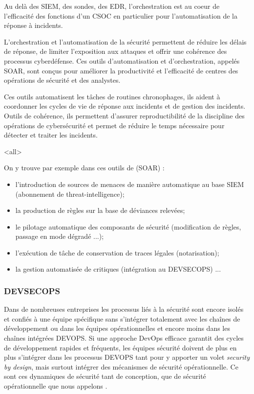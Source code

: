 Au delà des SIEM, des sondes, des EDR, l'orchestration est au coeur de l'efficacité des fonctions d'un CSOC en particulier pour l'automatisation de la réponse à incidents.

L'orchestration et l'automatisation de la sécurité  permettent de réduire les délais de réponse, de  limiter l'exposition aux attaques et offrir une cohérence des processus cyberdéfense. Ces  outils d’automatisation et d’orchestration,  appelés SOAR, sont conçus pour améliorer la productivité et l’efficacité de centres des opérations de sécurité et des analystes.

Ces outils automatisent les tâches de routines chronophages,  ils aident à coordonner les cycles de vie de réponse aux incidents et de gestion des incidents. Outils de  cohérence, ils permettent d'assurer reproductibilité de la discipline des opérations de cybersécurité et permet de réduire le temps nécessaire pour détecter et traiter les incidents.


\mode<all>{
{
On y trouve par exemple dans ces outils de   (SOAR) :
\begin{itemize}
  \item l'introduction de sources de menaces de manière automatique au base SIEM (abonnement de threat-intelligence);
  \item la production de règles sur la base de déviances relevées;
  \item le pilotage automatique des composants de sécurité (modification de règles, passage en mode dégradé ...);
  \item l'exécution de tâche de conservation de traces légales (notarisation);
  \item la gestion automatisée de  critiques (intégration au DEVSECOPS) ...
\end{itemize}
}} %



\subsubsection{DEVSECOPS}

Dans de nombreuses entreprises les processus liés à la sécurité sont encore isolés et confiés à une équipe spécifique sans s'intégrer totalement avec les chaînes de développement ou dans les équipes opérationnelles et encore moins dans les chaînes intégrées DEVOPS. 
 Si une approche DevOps efficace garantit des cycles de développement rapides et fréquents, les équipes sécurité doivent de plus en plus s'intégrer dans les processus DEVOPS tant pour y apporter un volet \textit{security by design}, mais surtout intégrer des mécanismes de sécurité opérationnelle.
 Ce sont ces dynamiques de sécurité tant de conception, que de sécurité opérationnelle que nous appelons .
 
